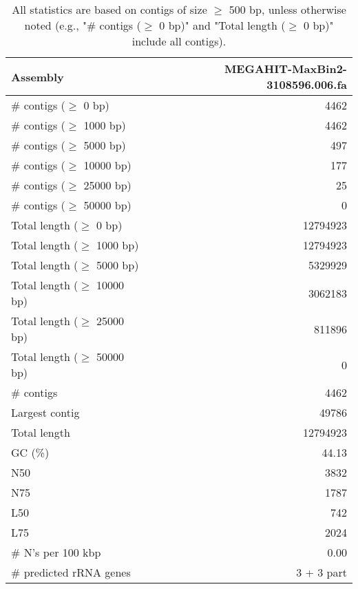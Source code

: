 \documentclass[12pt,a4paper]{article}
\begin{document}
\begin{table}[ht]
\begin{center}
\caption{All statistics are based on contigs of size $\geq$ 500 bp, unless otherwise noted (e.g., "\# contigs ($\geq$ 0 bp)" and "Total length ($\geq$ 0 bp)" include all contigs).}
\begin{tabular}{|l*{1}{|r}|}
\hline
Assembly & MEGAHIT-MaxBin2-3108596.006.fa \\ \hline
\# contigs ($\geq$ 0 bp) & 4462 \\ \hline
\# contigs ($\geq$ 1000 bp) & 4462 \\ \hline
\# contigs ($\geq$ 5000 bp) & 497 \\ \hline
\# contigs ($\geq$ 10000 bp) & 177 \\ \hline
\# contigs ($\geq$ 25000 bp) & 25 \\ \hline
\# contigs ($\geq$ 50000 bp) & 0 \\ \hline
Total length ($\geq$ 0 bp) & 12794923 \\ \hline
Total length ($\geq$ 1000 bp) & 12794923 \\ \hline
Total length ($\geq$ 5000 bp) & 5329929 \\ \hline
Total length ($\geq$ 10000 bp) & 3062183 \\ \hline
Total length ($\geq$ 25000 bp) & 811896 \\ \hline
Total length ($\geq$ 50000 bp) & 0 \\ \hline
\# contigs & 4462 \\ \hline
Largest contig & 49786 \\ \hline
Total length & 12794923 \\ \hline
GC (\%) & 44.13 \\ \hline
N50 & 3832 \\ \hline
N75 & 1787 \\ \hline
L50 & 742 \\ \hline
L75 & 2024 \\ \hline
\# N's per 100 kbp & 0.00 \\ \hline
\# predicted rRNA genes & 3 + 3 part \\ \hline
\end{tabular}
\end{center}
\end{table}
\end{document}
